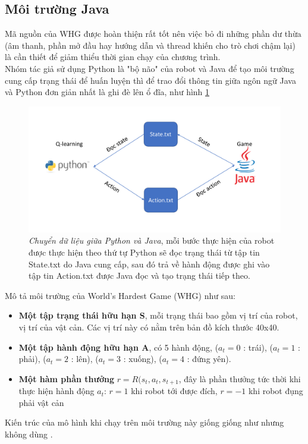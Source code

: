 \subsection{Môi trường Java}
Mã nguồn của WHG được hoàn thiện rất tốt nên việc bỏ đi những phần dư thừa (âm thanh, phần mở đầu hay hướng dẫn và thread khiến cho trò chơi chậm lại) là cần thiết để giảm thiểu thời gian chạy của chương trình.\\
Nhóm tác giả sử dụng Python là "bộ não" của robot và Java để tạo môi trường cung cấp trạng thái để huấn luyện thì để trao đổi thông tin giữa ngôn ngữ Java và Python đơn giản nhất là ghi đè lên ổ đĩa, như hình \ref{fig:transfer_java_env}\\
\begin{figure}[h]
    \centering
    \includegraphics[width=130mm,scale=0.3]{Pic/transfer_java_env.pdf}
    \caption[Chuyển dữ liệu giữa Python và Java]{\textit{Chuyển dữ liệu giữa Python và Java}, mỗi bước thực hiện của robot được thực hiện theo thứ tự Python sẽ đọc trạng thái từ tập tin State.txt do Java cung cấp, sau đó trả về hành động được ghi vào tập tin Action.txt được Java đọc và tạo trạng thái tiếp theo.}
    \label{fig:transfer_java_env}
\end{figure}
Mô tả môi trường của World's Hardest Game (WHG) như sau:\label{begin_setting}
\begin{itemize}
    \item \textbf{Một tập trạng thái hữu hạn S}, mỗi trạng thái bao gồm vị trí của robot, vị trí của vật cản. Các vị trí này có nằm trên bản đồ kích thước 40x40.
    \item \textbf{Một tập hành động hữu hạn A},  có 5 hành động,  ($a_t=0$ : trái),  ($a_t=1$ : phải), ($a_t=2$ : lên), ($a_t=3$ : xuống), ($a_t=4$ : đứng yên).
    \item \textbf{Một hàm phần thưởng} $r = R(s_t, a_t, s_{t+1}$, đây là phần thưởng tức thời khi thực hiện hành động $a_t$: $r =1$ khi robot tới được đích, $r=-1$ khi robot đụng phải vật cản
\end{itemize}
Kiến trúc của mô hình khi chạy trên môi trường này giống giống như \cite{DBLP:journals/corr/MnihKSGAWR13} nhưng không dùng .
